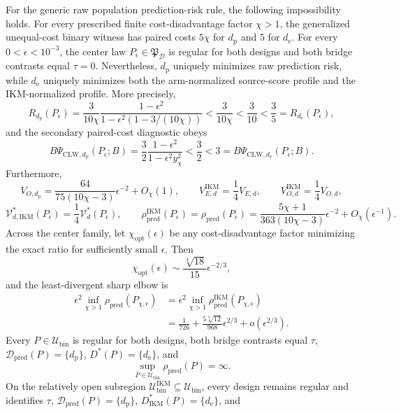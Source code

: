 For the generic raw population prediction-risk rule, the following impossibility holds. For every prescribed finite cost-disadvantage factor \(\chi>1\), the generalized unequal-cost binary witness has paired costs \(5\chi\) for \(d_{\mathrm p}\) and \(5\) for \(d_{\mathrm e}\). For every \(0<\epsilon<10^{-3}\), the center law \(P_\epsilon\in\mathfrak P_{\mathcal D}\) is regular for both designs and both bridge contrasts equal \(\tau=0\). Nevertheless, \(d_{\mathrm p}\) uniquely minimizes raw prediction risk, while \(d_{\mathrm e}\) uniquely minimizes both the arm-normalized source-score profile and the IKM-normalized profile. More precisely,
\[
 R_{d_{\mathrm p}}(P_\epsilon)
 =\frac{3}{10\chi}\frac{1-\epsilon^2}{1-\epsilon^2(1-3/(10\chi))}
 <\frac{3}{10\chi}<\frac3{10}<\frac35
 =R_{d_{\mathrm e}}(P_\epsilon),
\]
and the secondary paired-cost diagnostic obeys
\[
 B\Psi_{\mathrm{CLW},d_{\mathrm p}}(P_\epsilon;B)
 =\frac32\frac{1-\epsilon^2}{1-\epsilon^2y_\chi^2}
 <\frac32<3
 =B\Psi_{\mathrm{CLW},d_{\mathrm e}}(P_\epsilon;B).
\]
Furthermore,
\[
 V_{O,d_{\mathrm p}}
 =\frac{64}{75(10\chi-3)}\epsilon^{-2}+O_\chi(1),
 \qquad
 V_{E,d}^{\mathrm{IKM}}=\frac14V_{E,d},
 \qquad
 V_{O,d}^{\mathrm{IKM}}=\frac14V_{O,d},
\]
\[
 \mathcal V_{d,\mathrm{IKM}}^*(P_\epsilon)
 =\frac14\mathcal V_d^*(P_\epsilon),
 \qquad
 \rho_{\mathrm{pred}}^{\mathrm{IKM}}(P_\epsilon)
 =\rho_{\mathrm{pred}}(P_\epsilon)
 =\frac{5\chi+1}{363(10\chi-3)}\epsilon^{-2}
 +O_\chi(\epsilon^{-1}).
\]
Across the center family, let \(\chi_{\mathrm{opt}}(\epsilon)\) be any cost-disadvantage factor minimizing the exact ratio for sufficiently small \(\epsilon\). Then
\[
 \chi_{\mathrm{opt}}(\epsilon)
 \sim \frac{\sqrt[3]{18}}{15}\epsilon^{-2/3},
\]
and the least-divergent sharp elbow is
\[
\begin{aligned}
 \epsilon^2\inf_{\chi>1}\rho_{\mathrm{pred}}(P_{\chi,\epsilon})
 &=\epsilon^2\inf_{\chi>1}\rho_{\mathrm{pred}}^{\mathrm{IKM}}(P_{\chi,\epsilon})\\
 &=\frac1{726}+\frac{5\sqrt[3]{12}}{968}\epsilon^{2/3}
 +o(\epsilon^{2/3}).
\end{aligned}
\]
Every \(P\in\mathcal U_{\mathrm{bin}}\) is regular for both designs, both bridge contrasts equal \(\tau\), \(\mathcal D_{\mathrm{pred}}(P)=\{d_{\mathrm p}\}\), \(D^*(P)=\{d_{\mathrm e}\}\), and
\[
 \sup_{P\in\mathcal U_{\mathrm{bin}}}\rho_{\mathrm{pred}}(P)=\infty.
\]
On the relatively open subregion \(\mathcal U_{\mathrm{bin}}^{\mathrm{IKM}}\subseteq\mathcal U_{\mathrm{bin}}\), every design remains regular and identifies \(\tau\), \(\mathcal D_{\mathrm{pred}}(P)=\{d_{\mathrm p}\}\), \(D_{\mathrm{IKM}}^*(P)=\{d_{\mathrm e}\}\), and
